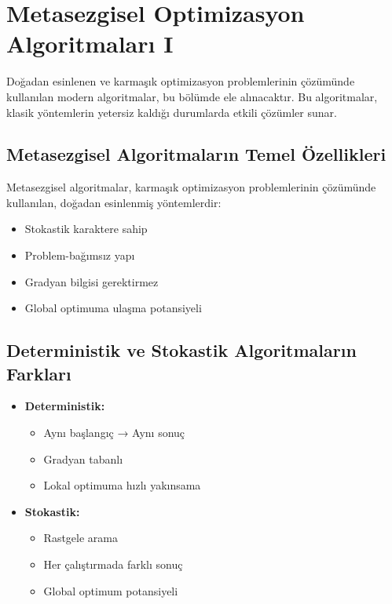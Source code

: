 \section{Metasezgisel Optimizasyon Algoritmaları I}
Doğadan esinlenen ve karmaşık optimizasyon problemlerinin çözümünde kullanılan modern algoritmalar, bu bölümde ele alınacaktır. Bu algoritmalar, klasik yöntemlerin yetersiz kaldığı durumlarda etkili çözümler sunar.

\subsection{Metasezgisel Algoritmaların Temel Özellikleri}

Metasezgisel algoritmalar, karmaşık optimizasyon problemlerinin çözümünde kullanılan, doğadan esinlenmiş yöntemlerdir:

\begin{itemize}
    \item Stokastik karaktere sahip
    \item Problem-bağımsız yapı
    \item Gradyan bilgisi gerektirmez
    \item Global optimuma ulaşma potansiyeli
\end{itemize}


\subsection{Deterministik ve Stokastik Algoritmaların Farkları}

\begin{tcolorbox}[title=Deterministik vs Stokastik]
\begin{itemize}
    \item \textbf{Deterministik:}
        \begin{itemize}
            \item Aynı başlangıç → Aynı sonuç
            \item Gradyan tabanlı
            \item Lokal optimuma hızlı yakınsama
        \end{itemize}
    \item \textbf{Stokastik:}
        \begin{itemize}
            \item Rastgele arama
            \item Her çalıştırmada farklı sonuç
            \item Global optimum potansiyeli
        \end{itemize}
\end{itemize}
\end{tcolorbox}

